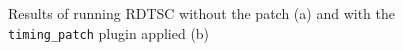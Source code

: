 \begin{figure}[htp]
    \centering
    \caption{Results of running RDTSC without the patch (a) and with the \lstinline{timing_patch} plugin applied (b)}%
    \label{fig:rdtsc1}%
\end{figure}

